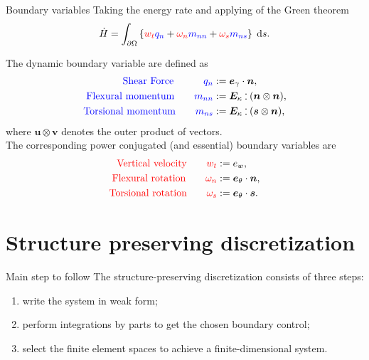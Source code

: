 \documentclass{beamer}
\def\onedot{$\mathsurround0pt\ldotp$}
\def\cddot{%
	\mathbin{\vcenter{\baselineskip.67ex
			\hbox{\onedot}\hbox{\onedot}}%
}}
\begin{document}
\begin{frame}{Boundary variables}
Taking the energy rate and applying of the Green theorem
\begin{equation*}
\dot{H}= \int_{\partial \Omega} \left\{ \textcolor{red}{w_t} \textcolor{blue}{q_n}  + \textcolor{red}{\omega_n} \textcolor{blue}{m_{nn}} + \textcolor{red}{\omega_s} \textcolor{blue}{m_{ns}} \right\} \d{s}.  
\end{equation*}

The dynamic boundary variable are defined as
\begin{equation*}
\begin{aligned}
\textcolor{blue}{\text{Shear Force}} \qquad \quad \textcolor{blue}{q_{n}} &:=  \bm{e}_{\gamma} \cdot \bm{n},  \\
\textcolor{blue}{\text{Flexural momentum}} \qquad \textcolor{blue}{m_{nn}} &:=   \bm{E}_{\kappa} \cddot (\bm{n}\otimes{\bm{n}}), 	\\
\textcolor{blue}{\text{Torsional momentum}} \qquad \textcolor{blue}{m_{ns}} &:=  \bm{E}_{\kappa} \cddot (\bm{s} \otimes{\bm{n}}),	
\end{aligned}
\end{equation*}
where $\bm{u} \otimes {\bm{v}}$ denotes the outer product of vectors. \\
The corresponding power conjugated (and essential) boundary variables  are
\begin{equation*}
\begin{aligned}
\textcolor{red}{\text{Vertical velocity}}  \qquad \textcolor{red}{w_t} &:= e_w, \\
\textcolor{red}{\text{Flexural rotation}} \qquad 
\textcolor{red}{\omega_{n}} &:=  \bm{e}_\theta \cdot \bm{n}, \\
\textcolor{red}{\text{Torsional rotation}} \qquad 
\textcolor{red}{\omega_{s}} &:=  \bm{e}_\theta \cdot \bm{s}.
\end{aligned}
\end{equation*}
\end{frame}

\section{Structure preserving discretization}

\begin{frame}{Main step to follow}
The structure-preserving discretization consists of three steps: 
\begin{enumerate}
	\item write the system in weak form;
	\item perform integrations by parts to get the chosen boundary control;
	\item select the finite element spaces to achieve a finite-dimensional system.
\end{enumerate}
\end{frame}
\end{document}
